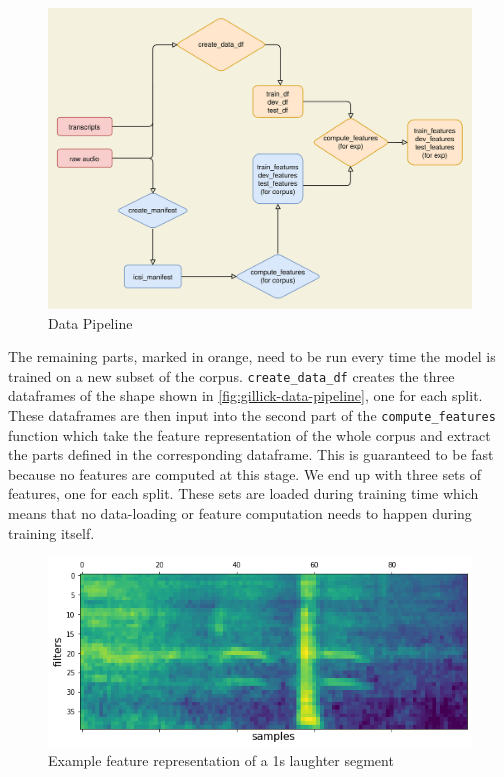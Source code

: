 \documentclass[bsc,frontabs,parskip,deptreport]{infthesis}
\begin{document}
\begin{figure}[h!]
    \centering
    \includegraphics[width=15cm]{imgs/diagrams/Pipeline.drawio.png}
    \caption{Data Pipeline}
    \label{fig:data-pipeline}
\end{figure}

The remaining parts, marked in orange, need to be run every time the model is trained on a new subset of the corpus.
\verb|create_data_df| creates the three dataframes of the shape shown in \autoref{fig:gillick-data-pipeline}, one for each split.
These dataframes are then input into the second part of the \verb|compute_features| function which take the feature representation of the whole corpus and extract the parts defined in the corresponding dataframe. This is guaranteed to be fast because no features are computed at this stage.
We end up with three sets of features, one for each split. 
These sets are loaded during training time which means that no data-loading or feature computation needs to happen during training itself.

\begin{figure}[h!]
    \centering
    \includegraphics[width=14cm]{imgs/sample_fbank_feat.png}
    \caption{Example feature representation of a 1s laughter segment}
    \label{fig:feature-sample}
\end{figure}
\end{document}
